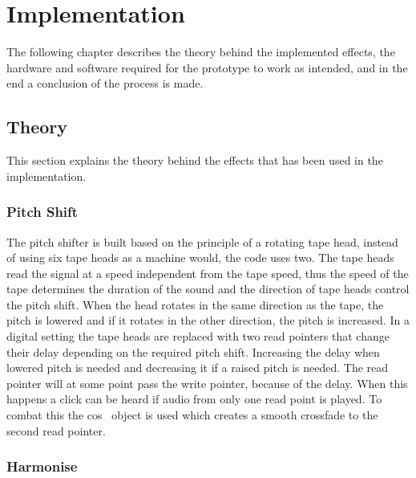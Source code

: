 \chapter{Implementation}

The following chapter describes the theory behind the implemented effects, the hardware and software required for the prototype to work as intended, and in the end a conclusion of the process is made. 

\section{Theory}

This section explains the theory behind the effects that has been used in the implementation. 

\subsection{Pitch Shift}

The pitch shifter is built based on the principle of a rotating tape head, instead of using six tape heads as a machine would, the code uses two\citep{Katjaas_00}. The tape heads read the signal at a speed independent from the tape speed, thus the speed of the tape determines the duration of the sound and the direction of tape heads control the pitch shift. When the head rotates in the same direction as the tape, the pitch is lowered and if it rotates in the other direction, the pitch is increased. 
In a digital setting the tape heads are replaced with two read pointers that change their delay depending on the required pitch shift. Increasing the delay when lowered pitch is needed and decreasing it if a raised pitch is needed. 
The read pointer will at some point pass the write pointer, because of the delay. When this happens a click can be heard if audio from only one read point is played. To combat this the cos~ object is used which creates a smooth crossfade to the second read pointer.

\subsection{Harmonise}

